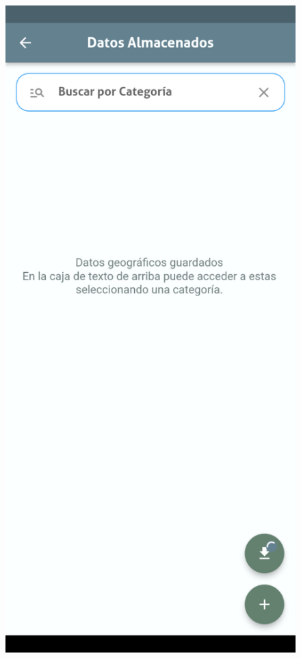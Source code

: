 \documentclass[12pt, a4paper]{book}
\begin{document}
\begin{figure}[H]
  \centering
  \begin{minipage}[b]{0.3\textwidth}
    \centering
    \includegraphics[width=\textwidth]{images/functionality_test/geodata_exporter1.png}

\end{minipage}
\end{figure}
\end{document}
